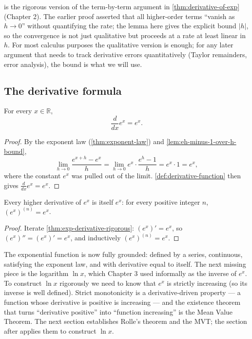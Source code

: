 \begin{caution}
 is the rigorous version of the term-by-term argument in \cref{thm:derivative-of-exp} (Chapter 2). The earlier proof asserted that all higher-order terms ``vanish as \(h \to 0\)'' without quantifying the rate; the lemma here gives the explicit bound \(\lvert h \rvert\), so the convergence is not just qualitative but proceeds at a rate at least linear in \(h\). For most calculus purposes the qualitative version is enough; for any later argument that needs to track derivative errors quantitatively (Taylor remainders, error analysis), the bound is what we will use.
\end{caution}

\subsection{The derivative formula}

\begin{theorem}\label{thm:exp-derivative-rigorous}
For every \(x \in \mathbb{R}\),
\[
\frac{d}{dx} e^{x} = e^{x}.
\]
\end{theorem}

\begin{proof}
By the exponent law (\cref{thm:exponent-law}) and \cref{lem:eh-minus-1-over-h-bound},
\[
\lim_{h \to 0} \frac{e^{x + h} - e^{x}}{h}
= \lim_{h \to 0} e^{x} \cdot \frac{e^{h} - 1}{h}
= e^{x} \cdot 1
= e^{x},
\]
where the constant \(e^{x}\) was pulled out of the limit. \cref{def:derivative-function} then gives \(\frac{d}{dx} e^{x} = e^{x}\).
\end{proof}

\begin{corollary}\label{cor:exp-higher-derivatives}
Every higher derivative of \(e^{x}\) is itself \(e^{x}\): for every positive integer \(n\), \((e^{x})^{(n)} = e^{x}\).
\end{corollary}

\begin{proof}
Iterate \cref{thm:exp-derivative-rigorous}: \((e^{x})' = e^{x}\), so \((e^{x})'' = (e^{x})' = e^{x}\), and inductively \((e^{x})^{(n)} = e^{x}\).
\end{proof}

The exponential function is now fully grounded: defined by a series, continuous, satisfying the exponent law, and with derivative equal to itself. The next missing piece is the logarithm \(\ln x\), which Chapter 3 used informally as the inverse of \(e^{x}\). To construct \(\ln x\) rigorously we need to know that \(e^{x}\) is strictly increasing (so its inverse is well defined). Strict monotonicity is a derivative-driven property --- a function whose derivative is positive is increasing --- and the existence theorem that turns ``derivative positive'' into ``function increasing'' is the Mean Value Theorem. The next section establishes Rolle's theorem and the MVT; the section after applies them to construct \(\ln x\).

